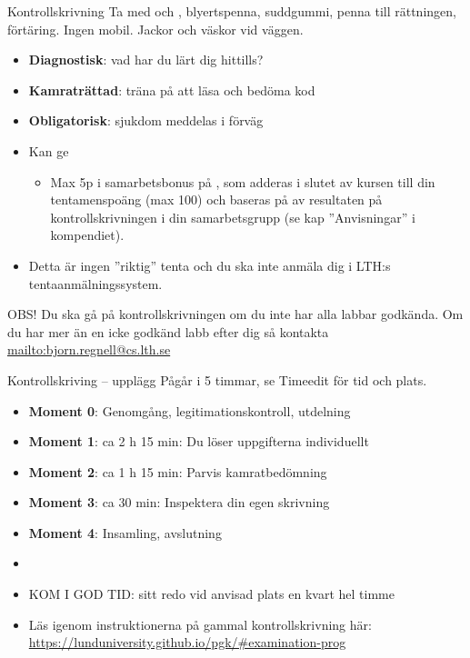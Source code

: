 


\begin{Slide}{Kontrollskrivning}\SlideFontSmall
Ta med  och , blyertspenna, suddgummi,  penna till rättningen, förtäring. Ingen mobil. Jackor och väskor vid väggen.
\begin{itemize}
  \item \textbf{Diagnostisk}: vad har du lärt dig hittills?
  \item \textbf{Kamraträttad}: träna på att läsa och bedöma kod
  \item \textbf{Obligatorisk}: sjukdom  meddelas i förväg
  \item Kan ge  
  \begin{itemize}\SlideFontTiny
    \item[] Max 5p i samarbetsbonus på , som adderas i slutet av kursen till din tentamenspoäng (max 100) och baseras på  av resultaten på kontrollskrivningen i din samarbetsgrupp (se kap ''Anvisningar'' i kompendiet).
  \end{itemize}
  \ifkompendium\else
  \item Detta är ingen ''riktig'' tenta och du ska inte anmäla dig i LTH:s tentaanmälningssystem.
  \fi
\end{itemize}
OBS! Du ska gå på kontrollskrivningen  om du inte har alla labbar godkända. Om du har mer än en icke godkänd labb efter dig så kontakta \url{mailto:bjorn.regnell@cs.lth.se}
\end{Slide}

\begin{Slide}{Kontrollskriving -- upplägg}\SlideFontSmall
Pågår i 5 timmar, se Timeedit för tid och plats.
\begin{itemize}
\item \textbf{Moment 0}: Genomgång, legitimationskontroll, utdelning
\item \textbf{Moment 1}: ca 2 h 15 min: Du löser uppgifterna individuellt
\item \textbf{Moment 2}: ca 1 h 15 min: Parvis kamratbedömning
\item \textbf{Moment 3}: ca 30 min: Inspektera din egen skrivning
\item \textbf{Moment 4}: Insamling, avslutning
\item[]
\item KOM I GOD TID: sitt redo vid anvisad plats en kvart  hel timme
\item Läs  igenom instruktionerna på gammal kontrollskrivning här: 
\url{https://lunduniversity.github.io/pgk/#examination-prog}

\end{itemize}


\end{Slide}

